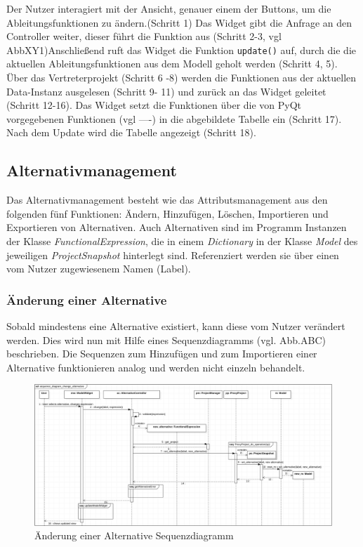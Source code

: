 \documentclass{article}
\begin{document}
Der Nutzer interagiert mit der Ansicht, genauer einem der Buttons, um die Ableitungsfunktionen zu ändern.(Schritt 1) Das Widget gibt die Anfrage an den Controller weiter, dieser führt die Funktion aus (Schritt 2-3, vgl AbbXY1)Anschließend ruft das Widget die Funktion \texttt{update()} auf, durch die die aktuellen Ableitungsfunktionen aus dem Modell geholt werden (Schritt 4, 5). Über das Vertreterprojekt (Schritt 6 -8) werden die Funktionen aus der aktuellen Data-Instanz ausgelesen (Schritt 9- 11) und zurück an das Widget geleitet (Schritt 12-16). Das Widget setzt die Funktionen über die von PyQt vorgegebenen Funktionen (vgl ----) in die abgebildete Tabelle ein (Schritt 17). Nach dem Update wird die Tabelle angezeigt (Schritt 18).


\newpage
\subsection{Alternativmanagement}
Das Alternativmanagement besteht wie das Attributsmanagement aus den folgenden fünf Funktionen: Ändern, Hinzufügen, Löschen, Importieren und Exportieren von Alternativen. Auch Alternativen sind im Programm Instanzen der Klasse \textit{FunctionalExpression}, die in einem \textit{Dictionary} in der Klasse \textit{Model} des jeweiligen \textit{ProjectSnapshot} hinterlegt sind. Referenziert werden sie über einen vom Nutzer zugewiesenem Namen (Label).
\subsubsection{Änderung einer Alternative}
Sobald mindestens eine Alternative existiert, kann diese vom Nutzer verändert werden. Dies wird nun mit Hilfe eines Sequenzdiagramms (vgl. Abb.ABC) beschrieben. Die Sequenzen zum Hinzufügen und zum Importieren einer Alternative funktionieren analog und werden nicht einzeln behandelt.
\begin{figure}[H]%
    \centering
    \includegraphics[width=12cm]{entwurf/Entwurf_dokument/img/Kevin/ChangeAlternative.png}
    \caption{Änderung einer Alternative Sequenzdiagramm}
    \label{ChangeDerivativeSequenceDiagram}
\end{figure}
\end{document}
